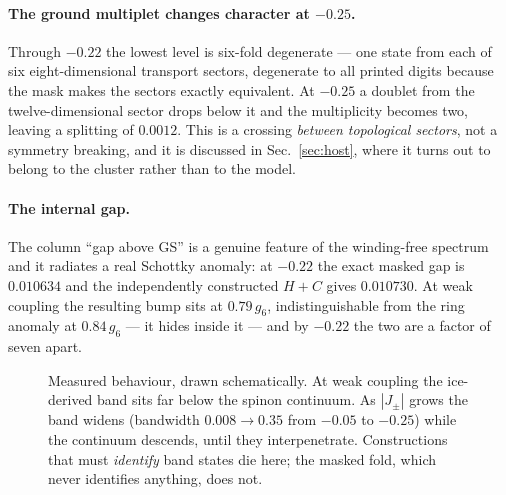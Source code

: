 \documentclass[11pt,a4paper]{article}
\newcommand{\Jpm}{J_{\pm}}
\newcommand{\gsix}{g_6}
\begin{document}
\paragraph{The ground multiplet changes character at $-0.25$.}  Through
$-0.22$ the lowest level is six-fold degenerate --- one state from each of
six eight-dimensional transport sectors, degenerate to all printed digits
because the mask makes the sectors exactly equivalent.  At $-0.25$ a doublet
from the twelve-dimensional sector drops below it and the multiplicity
becomes two, leaving a splitting of $0.0012$.  This is a crossing
\emph{between topological sectors}, not a symmetry breaking, and it is
discussed in Sec.~\ref{sec:host}, where it turns out to belong to the
cluster rather than to the model.

\paragraph{The internal gap.}  The column ``gap above GS'' is a genuine
feature of the winding-free spectrum and it radiates a real Schottky
anomaly: at $-0.22$ the exact masked gap is $0.010634$ and the independently
constructed $H+C$ gives $0.010730$.  At weak coupling the resulting bump
sits at $0.79\,\gsix$, indistinguishable from the ring anomaly at
$0.84\,\gsix$ --- it hides inside it --- and by $-0.22$ the two are a factor
of seven apart.

\begin{figure}[h]
\centering
{}
\caption{Measured behaviour, drawn schematically.  At weak coupling the
ice-derived band sits far below the spinon continuum.  As $|\Jpm|$ grows the
band widens (bandwidth $0.008\to0.35$ from $-0.05$ to $-0.25$) while the
continuum descends, until they interpenetrate.  Constructions that must
\emph{identify} band states die here; the masked fold, which never
identifies anything, does not.}
\label{fig:dissolve}
\end{figure}
\end{document}
